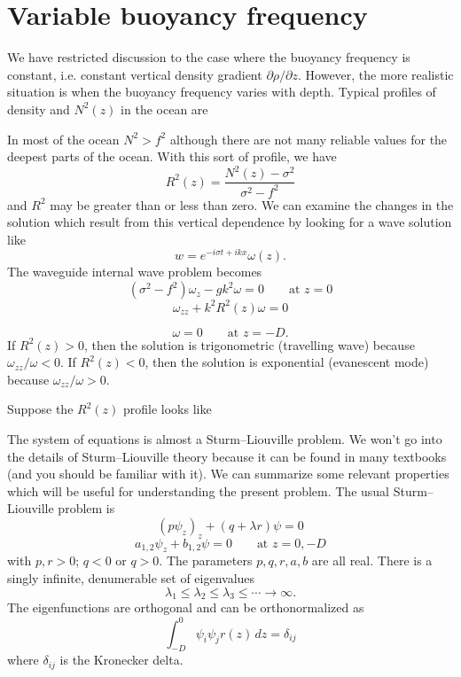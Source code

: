 \section{Variable buoyancy frequency}

We have restricted discussion to the case where the buoyancy frequency is constant,
i.e. constant vertical density gradient $\partial\rho/\partial z$. However, the more realistic situation is
when the buoyancy frequency varies with depth. Typical profiles of density and $N^2(z)$
in the ocean are


In most of the ocean $N^2>f^2$ although there are not many reliable values for the
deepest parts of the ocean. With this sort of profile, we have
\[
	R^2(z)=\frac{N^2(z)-\sigma^2}{\sigma^2-f^2}
\]
and $R^2$ may be greater than or less than zero. We can examine the changes in the
solution which result from this vertical dependence by looking for a wave solution like
\[
	w=e^{-i\sigma t+ikx}\omega(z).
\]
The waveguide internal wave problem becomes
\[
	(\sigma^2-f^2)\omega_z-gk^2\omega=0\qquad\text{at }z=0
\]
\[
	\omega_{zz}+k^2R^2(z)\omega=0
\]

\sourcepagebreak

\[
	\omega=0\qquad\text{at }z=-D.
\]
If $R^2(z)>0$, then the solution is trigonometric (travelling wave) because
$\omega_{zz}/\omega<0$. If $R^2(z)<0$, then the solution is exponential (evanescent mode) because
$\omega_{zz}/\omega>0$.

Suppose the $R^2(z)$ profile looks like


The system of equations is almost a Sturm--Liouville problem. We won't go into the
details of Sturm--Liouville theory because it can be found in many textbooks (and you
should be familiar with it). We can summarize some relevant properties which will be
useful for understanding the present problem. The usual Sturm--Liouville problem is
\[
	(p\psi_z)_z+(q+\lambda r)\psi=0
\]
\[
	a_{1,2}\psi_z+b_{1,2}\psi=0\qquad\text{at }z=0,-D
\]
with $p,r>0$; $q<0$ or $q>0$. The parameters $p,q,r,a,b$ are all real. There is a singly
infinite, denumerable set of eigenvalues
\[
	\lambda_1\le\lambda_2\le\lambda_3\le\cdots\to\infty.
\]
The eigenfunctions are orthogonal and can be orthonormalized as
\[
	\int_{-D}^{0}\psi_i\psi_jr(z)\,dz=\delta_{ij}
\]
where $\delta_{ij}$ is the Kronecker delta.

